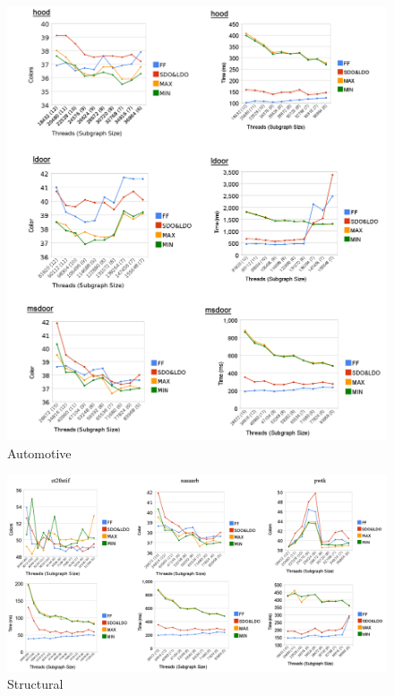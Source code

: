 \documentclass[preprint]{sigplanconf}
\begin{document}
\begin{figure}[h]
  \includegraphics[scale=0.4]{figures/automotive.png}
  \caption{ Automotive }
\end{figure}

\begin{figure}[h]
  \includegraphics[scale=0.3]{figures/structuralLand.png}
  \caption{ Structural }
\end{figure}
\end{document}
